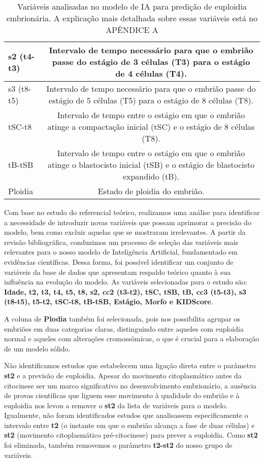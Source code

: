 \begin{table}[ht]
\begin{tabular}{|l|c|}
  s2 (t4-t3) & Intervalo de tempo necessário para que o embrião passe do estágio de 3 células (T3) para o estágio de 4 células (T4). \\ \hline
  s3 (t8-t5) & Intervalo de tempo necessário para que o embrião passe do estágio de 5 células (T5) para o estágio de 8 células (T8). \\ \hline
  tSC-t8 & Intervalo de tempo entre o estágio em que o embrião atinge a compactação inicial (tSC) e o estágio de 8 células (T8). \\ \hline
  tB-tSB & Intervalo de tempo entre o estágio em que o embrião atinge o blastocisto inicial (tSB) e o estágio de blastocisto expandido (tB). \\ \hline
  Ploidia & Estado de ploidia do embrião. \\ \hline
  \end{tabular}
  \caption{Variáveis analisadas no modelo de IA para predição de euploidia embrionária. A explicação mais detalhada sobre essas variáveis está no APÊNDICE A}
  \label{tab:definicoes_variaveis}
\end{table}

Com base no estudo do referencial teórico, realizamos uma análise para identificar a necessidade de introduzir novas variáveis que possam aprimorar a precisão do modelo, bem como excluir aquelas que se mostraram irrelevantes. A partir da revisão bibliográfica, conduzimos um processo de seleção das variáveis mais relevantes para o nosso modelo de Inteligência Artificial, fundamentado em evidências científicas. Dessa forma, foi possível identificar um conjunto de variáveis da base de dados que apresentam respaldo teórico quanto à sua influência na evolução do modelo. As variáveis selecionadas para o estudo são: \textbf{Idade, t2, t3, t4, t5, t8, s2, cc2 (t3-t2), tSC, tSB, tB, cc3 (t5-t3), s3 (t8-t5), t5-t2, tSC-t8, tB-tSB, Estágio, Morfo e KIDScore}.

A coluna de \textbf{Plodia} também foi selecionada, pois nos possibilita agrupar os embriões em duas categorias claras, distinguindo entre aqueles com euploidia normal e aqueles com alterações cromossômicas, o que é crucial para a elaboração de um modelo sólido.

Não identificamos estudos que estabelecem uma ligação direta entre o parâmetro \textbf{st2} e a previsão de euploidia. Apesar do movimento citoplasmático antes da citocinese ser um marco significativo no desenvolvimento embrionário, a ausência de provas científicas que liguem esse movimento à qualidade do embrião e à euploidia nos levou a remover o \textbf{st2} da lista de variáveis para o modelo. Igualmente, não foram identificados estudos que analisassem especificamente o intervalo entre \textbf{t2} (o instante em que o embrião alcança a fase de duas células) e \textbf{st2} (movimento citoplasmático pré-citocinese) para prever a euploidia. Como \textbf{st2} foi eliminada, também removemos o parâmetro \textbf{t2-st2} do nosso grupo de variáveis.

